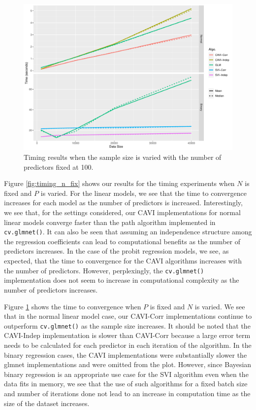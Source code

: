 \documentclass[]{article}
\let\code=\texttt
\newcommand{\fct}[1]{\code{#1()}}
\newcommand{\pkg}[1]{{\fontseries{b}\selectfont #1}}
\begin{document}
\begin{figure}
	\centering
	\includegraphics[scale=0.5]{timing_p_fix.pdf}
	\caption{Timing results when the sample size is varied with the number 
		of predictors fixed at 100.}	\label{fig:timing_p_fix}
\end{figure}

Figure \ref{fig:timing_n_fix} shows our results for the timing experiments when
$N$ is fixed and $P$ is varied. For the linear models, we see that the time to
convergence increases for each model as the number of predictors is increased.
Interestingly, we see that, for the settings considered, our CAVI
implementations for normal linear models converge faster than the path algorithm
implemented in \fct{cv.glmnet}. It can also be seen that assuming an
independence structure among the regression coefficients can lead to
computational benefits as the number of predictors increases. In the case of the
probit regression models, we see, as expected, that the time to convergence for
the CAVI algorithms increases with the number of predictors. However,
perplexingly, the \fct{cv.glmnet} implementation does not seem to increase in
computational complexity as the number of predictors increases.

Figure \ref{fig:timing_p_fix} shows the time to convergence when $P$ is fixed
and $N$ is varied. We see that in the normal linear model case, our CAVI-Corr
implementations continue to outperform \fct{cv.glmnet} as the sample size
increases. It should be noted that the CAVI-Indep implementation is slower than
CAVI-Corr because a large error term needs to be calculated for each predictor
in each iteration of the algorithm. In the binary regression cases, the
CAVI implementations were substantially slower the \pkg{glmnet} implementations 
and were omitted from the plot.  However, since Bayesian binary regression is an
appropriate use case for the SVI algorithm even when the data fits in memory, we
see that the use of such algorithms for a fixed batch size and number of
iterations done not lead to an increase in computation time as the size of the
dataset increases. 
\end{document}
